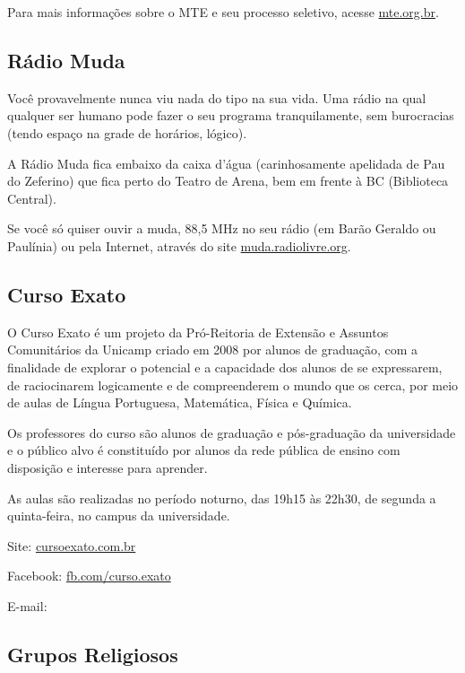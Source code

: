 Para mais informações sobre o MTE e seu processo seletivo, acesse
\url{mte.org.br}.

\subsection{Rádio Muda}

Você provavelmente nunca viu nada do tipo na sua vida. Uma rádio na qual
qualquer ser humano pode fazer o seu programa tranquilamente, sem burocracias
(tendo espaço na grade de horários, lógico).

A Rádio Muda fica embaixo da caixa d'água (carinhosamente apelidada de Pau do
Zeferino) que fica perto do Teatro de Arena, bem em frente à BC (Biblioteca
Central).

Se você só quiser ouvir a muda, 88,5 MHz no seu rádio (em Barão Geraldo ou
Paulínia) ou pela Internet, através do site \url{muda.radiolivre.org}.

\subsection{Curso Exato}

O Curso Exato é um projeto da Pró-Reitoria de Extensão e Assuntos Comunitários
da Unicamp criado em 2008 por alunos de graduação, com a finalidade de explorar
o potencial e a capacidade dos alunos de se expressarem, de raciocinarem
logicamente e de compreenderem o mundo que os cerca, por meio de aulas de Língua
Portuguesa, Matemática, Física e Química.

Os professores do curso são alunos de graduação e pós-graduação da universidade
e o público alvo é constituído por alunos da rede pública de ensino com
disposição e interesse para aprender.

As aulas são realizadas no período noturno, das 19h15 às 22h30, de segunda a
quinta-feira, no campus da universidade.

\begin{compactitemize}
    \item Site: \url{cursoexato.com.br}
    \item Facebook: \url{fb.com/curso.exato}
    \item E-mail: 
\end{compactitemize}

\subsection{Grupos Religiosos}

